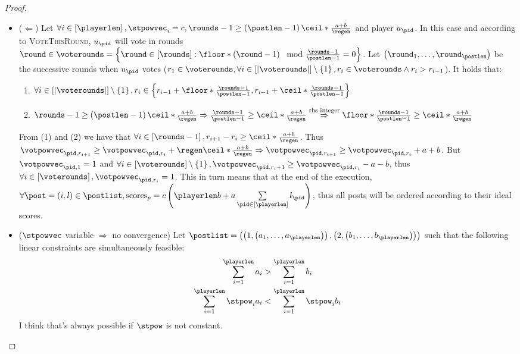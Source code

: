 \begin{proof}
  \begin{itemize}
    \item ($\Leftarrow$) Let $\forall i \in \left[\playerlen\right], \stpowvec_i
    = c, \rounds - 1 \geq \left(\postlen - 1\right)\ceil*{\frac{a+b}{\regen}}$
    and player $u_{\pid}$. In this case and according to \textsc{VoteThisRound},
    $u_{\pid}$ will vote in rounds $\round \in \voterounds = \left\{\round \in
    \left[\rounds\right] : \floor*{\left(\round - 1\right) \mod \frac{\rounds -
    1}{\postlen - 1}} = 0\right\}$. Let $\left(\round_1, \dots,
    \round_\postlen\right)$ be the successive rounds when $u_{\pid}$ votes ($r_1
    \in \voterounds, \forall i \in \left[|\voterounds|\right] \setminus
    \left\{1\right\}, r_i \in \voterounds \wedge r_i > r_{i - 1}$). It holds
    that:
    \begin{enumerate}
      \item $\forall i \in \left[|\voterounds|\right] \setminus
      \left\{1\right\}, r_i \in \left\{r_{i - 1} + \floor*{\frac{\rounds -
      1}{\postlen - 1}}, r_{i - 1} + \ceil*{\frac{\rounds - 1}{\postlen -
      1}}\right\}$

      \item $\rounds - 1 \geq \left(\postlen -
      1\right)\ceil*{\frac{a+b}{\regen}} \Rightarrow \frac{\rounds - 1}{\postlen
      - 1} \geq \ceil*{\frac{a+b}{\regen}} \overset{\text{rhs
      integer}}{\Rightarrow} \floor*{\frac{\rounds - 1}{\postlen - 1}} \geq
      \ceil*{\frac{a+b}{\regen}}$
    \end{enumerate}
    From (1) and (2) we have that $\forall i \in \left[\rounds - 1\right],
    r_{i+1} - r_i \geq \ceil*{\frac{a+b}{\regen}}$. Thus $\votpowvec_{\pid, r_{i
    + 1}} \geq \votpowvec_{\pid, r_i} + \regen\ceil*{\frac{a+b}{\regen}}
    \Rightarrow \votpowvec_{\pid, r_{i + 1}} \geq \votpowvec_{\pid, r_i} + a +
    b$. But $\votpowvec_{\pid, 1} = 1$ and $\forall i \in
    \left[\voterounds\right] \setminus \left\{1\right\}, \votpowvec_{\pid, r_i
    + 1} \geq \votpowvec_{\pid, r_i} - a - b$, thus $\forall i \in
    \left[\voterounds\right], \votpowvec_{\pid, r_i} = 1$. This in turn means
    that at the end of the execution, $\forall \post = \left(i, l\right) \in \postlist,
    \mathrm{scores}_{p} = c\left(\playerlen b + a \sum\limits_{\pid \in
    \left[\playerlen\right]} l_{\pid}\right)$, thus all posts will be ordered
    according to their ideal scores.

    \item ($\stpowvec$ variable $\Rightarrow$ no convergence) Let $\postlist =
    \left(\left(1, \left(a_1, \dots, a_\playerlen\right)\right), \left(2,
    \left(b_1, \dots, b_\playerlen\right)\right)\right)$ such that the following
    linear constraints are simultaneously feasible:
    \begin{gather*}
      \sum\limits_{i=1}^\playerlen a_i > \sum\limits_{i=1}^\playerlen b_i \\
      \sum\limits_{i=1}^\playerlen \stpow_i a_i < \sum\limits_{i=1}^\playerlen
      \stpow_i  b_i
    \end{gather*}
    I think that's always possible if $\stpow$ is not constant.


\end{itemize}
\end{proof}
